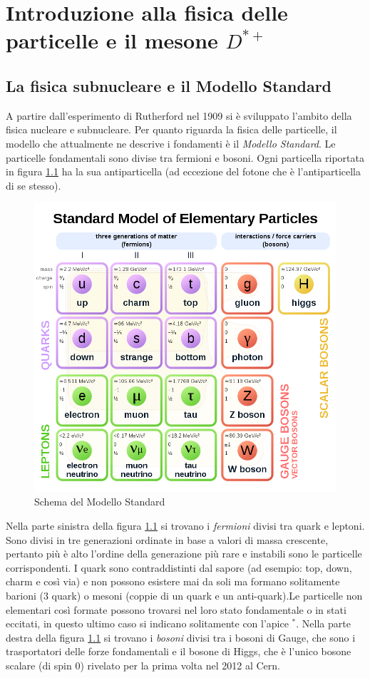 \chapter{Introduzione alla fisica delle particelle e il mesone $D^{*+}$ }

\section{La fisica subnucleare e il Modello Standard}
A partire dall'esperimento di Rutherford nel 1909 si è sviluppato l'ambito della fisica nucleare e subnucleare. Per quanto riguarda la fisica delle particelle, il modello che attualmente ne descrive i fondamenti è il \textit{Modello Standard}. Le particelle fondamentali sono divise tra fermioni e bosoni. Ogni particella riportata in figura \ref{fig:ModelloStandard} ha la sua antiparticella (ad eccezione del fotone che è l'antiparticella di se stesso). 

    \begin{figure}[htbp]
        \centering
        \includegraphics[width=0.65\linewidth]{introParticelle/ModelloStandard.png}
        \caption{Schema del Modello Standard}
        \label{fig:ModelloStandard}
    \end{figure}
    
Nella parte sinistra della figura \ref{fig:ModelloStandard} si trovano i \textit{fermioni} divisi tra quark e leptoni. Sono divisi in tre generazioni ordinate in base a valori di massa crescente, pertanto più è alto l'ordine della generazione più rare e instabili sono le particelle corrispondenti. I quark sono contraddistinti dal sapore (ad esempio: top, down, charm e così via) e non possono esistere mai da soli ma formano solitamente barioni (3 quark) o mesoni (coppie di un quark e un anti-quark).Le particelle non elementari così formate possono trovarsi nel loro stato fondamentale o in stati eccitati, in questo ultimo caso si indicano solitamente con l'apice $^*$. \cite{libro_nucleare}
Nella parte destra della figura \ref{fig:ModelloStandard} si trovano i \textit{bosoni} divisi tra i bosoni di Gauge, che sono i trasportatori delle forze fondamentali e il bosone di Higgs, che è l'unico bosone scalare (di spin 0) rivelato per la prima volta nel 2012 al Cern.

